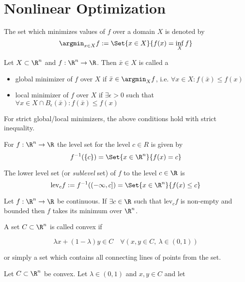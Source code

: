 \section{Nonlinear Optimization}\label{d1c9db1}

\def\pd{\succ} %
\def\psd{\succeq} %

\label{b27e478}

The set which minimizes values of $f$ over a domain $X$ is denoted by
$$
	\argmin_{x\in X}f:=\Set{x\in X}{f(x)=\inf_Xf}
$$

\label{bc7900e}

Let $X\subset\R^n$ and $f:\R^n\to\R$. Then $\bar x\in X$ is called a
\begin{itemize}
	\item global minimizer of $f$ over $X$ if $\bar x\in\argmin_Xf$,
	      i.e. $\forall x\in X:f(\bar x)\leq f(x)$
	\item local minimizer of $f$ over $X$ if $\exists\epsilon>0$ such
	      that $\forall x\in X\cap B_\epsilon(\bar x):f(\bar x)\leq f(x)$
\end{itemize}
For strict global/local minimizers, the above conditions hold with
strict inequality.

\label{d6589cc}

For $f:\R^n\to\R$ the level set for the level $c\in R$ is given by
$$
	f^{-1}(\{c\})=\Set{x\in\R^n}{f(x)=c}
$$

The lower level set (or \textit{sublevel} set) of $f$ to the level
$c\in\R$ is
$$
	\text{lev}_cf:=f^{-1}((-\infty,c])=\Set{x\in\R^n}{f(x)\leq c}
$$

\label{bd1eec0}

Let $f:\R^n\to\R$ be continuous. If $\exists c\in\R$ such that
$\text{lev}_cf$ is non-empty and bounded then $f$ takes its minimum
over $\R^n$.

\label{e012971}

A set $C\subset\R^n$ is called convex if

$$
	\lambda x+(1-\lambda)y\in C\quad
	\forall(x,y\in C,\ \lambda\in(0,1))
$$

or simply a set which contains all connecting lines of points from the
set.

\label{a114065}

Let $C\subset\R^n$ be convex. Let $\lambda\in(0,1)$ and $x,y\in C$ and
let

